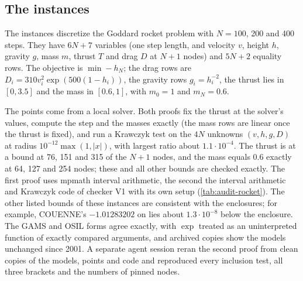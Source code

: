 \begin{certbox}
\end{certbox}

\subsection{The \texorpdfstring{}{rocket} instances}\label{app:audit-rocket}

The  instances discretize the Goddard rocket problem with $N=100$, 200 and 400 steps.
They have $6N+7$ variables (one step length, and velocity $v$, height $h$, gravity $g$, mass $m$, thrust $T$ and drag $D$ at $N+1$ nodes) and $5N+2$ equality rows.
The objective is $\min -h_N$; the drag rows are $D_i=310v_i^2\exp(500(1-h_i))$, the gravity rows $g_i=h_i^{-2}$, the thrust lies in $[0,3.5]$ and the mass in $[0.6,1]$, with $m_0=1$ and $m_N=0.6$.

The points come from a local solver.
Both proofs fix the thrust at the solver's values, compute the step and the masses exactly (the mass rows are linear once the thrust is fixed), and run a Krawczyk test on the $4N$ unknowns $(v,h,g,D)$ at radius $10^{-12}\max(1,|x|)$, with largest ratio about $1.1\cdot10^{-4}$.
The thrust is at a bound at 76, 151 and 315 of the $N+1$ nodes, and the mass equals 0.6 exactly at 64, 127 and 254 nodes; these and all other bounds are checked exactly.
The first proof uses mpmath interval arithmetic, the second the interval arithmetic and Krawczyk code of checker V1 with its own setup (\cref{tab:audit-rocket}).
The other listed bounds of these instances are consistent with the enclosures; for example, COUENNE's $-1.01283202$ on  lies about $1.3\cdot10^{-8}$ below the enclosure.
The GAMS and OSIL forms agree exactly, with $\exp$ treated as an uninterpreted function of exactly compared arguments, and archived copies show the models unchanged since 2001.
A separate agent session reran the second proof from clean copies of the models, points and code and reproduced every inclusion test, all three brackets and the numbers of pinned nodes.

